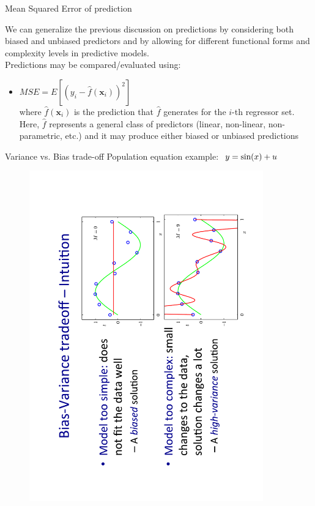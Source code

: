 \documentclass{beamer}
\begin{document}
\begin{frame}{Mean Squared Error of prediction}

We can generalize the previous discussion on predictions by considering both biased and unbiased predictors and by allowing for different functional forms and complexity levels in predictive models. \\ \bigskip 
Predictions may be compared/evaluated using:

\medskip
\begin{itemize}
   \item $\textit{MSE} = E
   \left[ \left( y_i - \hat{f}(\bm{x}_i) \right)^2 \right]$\\
   \smallskip
   where $\hat{f}(\bm{x}_i)$ is the prediction that $\hat{f}$ generates for the $i$-th regressor set. Here, $\hat{f}$ represents a general class of predictors (linear, non-linear, non-parametric, etc.) and it may produce either biased or unbiased predictions
\end{itemize}
\end{frame}
\begin{frame}{Variance vs. Bias trade-off}
Population equation example: $~y = \textnormal{sin}(x)+u$
\vspace{-1cm}
\begin{figure}
\includegraphics[angle=270,trim = 0cm 1cm 0cm 0cm, clip,width=0.9\textwidth]{img/VarBias.pdf}
\end{figure}
\end{frame}
\end{document}
